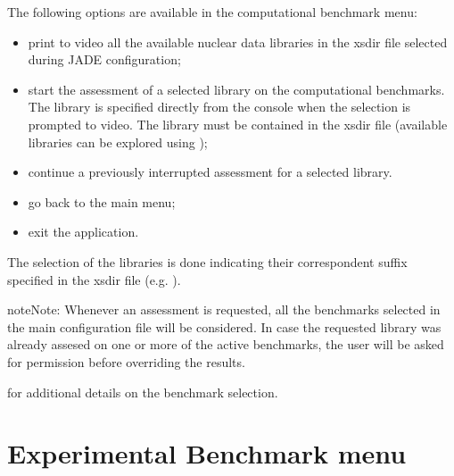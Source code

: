 \documentclass[letterpaper,10pt,english]{sphinxmanual}
\let\sphinxpxdimen\pdfpxdimen\else\newdimen\sphinxpxdimen
\begin{document}
The following options are available in the computational benchmark menu:
\begin{itemize}
\item {} 
 print to video all the available nuclear data libraries
in the xsdir file selected during JADE configuration;

\item {} 
 start the assessment of a selected library on the computational benchmarks. The library is
specified directly from the console when the selection is prompted to
video. The library must be contained in the xsdir file (available libraries
can be explored using );

\item {} 
 continue a previously interrupted assessment for a selected
library. 

\item {} 
 go back to the main menu;

\item {} 
 exit the application.

\end{itemize}

The selection of the libraries is done indicating their correspondent suffix specified in the xsdir file
(e.g. ).

\begin{sphinxadmonition}{note}{Note:}
Whenever an assessment is requested, all the benchmarks selected in the main configuration file will be considered.
In case the requested library was already assesed on one or more of the active benchmarks,
the user will be asked for permission before overriding the results.
\end{sphinxadmonition}




{\hyperref[\detokenize{usage/configuration:config}]{}} for additional details on the benchmark selection.




\section{Experimental Benchmark menu}
\label{\detokenize{usage/menu:experimental-benchmark-menu}}\label{\detokenize{usage/menu:expmenu}}
\noindent\sphinxincludegraphics[width=400\sphinxpxdimen]{{expmenu}.png}
\end{document}
